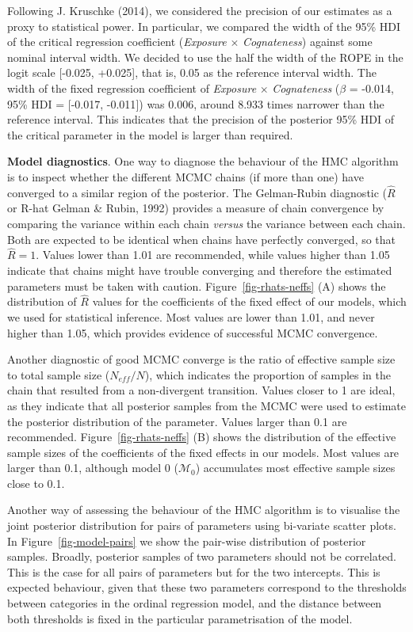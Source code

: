 \documentclass[
  12pt,
  b5paperpaper,
  twoside]{scrreprt}
\begin{document}
Following J. Kruschke (2014), we considered the precision of our
estimates as a proxy to statistical power. In particular, we compared
the width of the 95\% HDI of the critical regression coefficient
(\emph{Exposure} \(\times\) \emph{Cognateness}) against some nominal
interval width. We decided to use the half the width of the ROPE in the
logit scale {[}-0.025, +0.025{]}, that is, 0.05 as the reference
interval width. The width of the fixed regression coefficient of
\emph{Exposure} \(\times\) \emph{Cognateness} (\(\beta\) = -0.014, 95\%
HDI = {[}-0.017, -0.011{]}) was 0.006, around 8.933 times narrower than
the reference interval. This indicates that the precision of the
posterior 95\% HDI of the critical parameter in the model is larger than
required.

\textbf{Model diagnostics}. One way to diagnose the behaviour of the HMC
algorithm is to inspect whether the different MCMC chains (if more than
one) have converged to a similar region of the posterior. The
Gelman-Rubin diagnostic (\(\hat{R}\) or R-hat Gelman \& Rubin, 1992)
provides a measure of chain convergence by comparing the variance within
each chain \emph{versus} the variance between each chain. Both are
expected to be identical when chains have perfectly converged, so that
\(\hat{R} = 1\). Values lower than 1.01 are recommended, while values
higher than 1.05 indicate that chains might have trouble converging and
therefore the estimated parameters must be taken with caution.
Figure~\ref{fig-rhats-neffs} (A) shows the distribution of \(\hat{R}\)
values for the coefficients of the fixed effect of our models, which we
used for statistical inference. Most values are lower than 1.01, and
never higher than 1.05, which provides evidence of successful MCMC
convergence.

Another diagnostic of good MCMC converge is the ratio of effective
sample size to total sample size (\(N_{eff}/N\)), which indicates the
proportion of samples in the chain that resulted from a non-divergent
transition. Values closer to 1 are ideal, as they indicate that all
posterior samples from the MCMC were used to estimate the posterior
distribution of the parameter. Values larger than 0.1 are recommended.
Figure~\ref{fig-rhats-neffs} (B) shows the distribution of the effective
sample sizes of the coefficients of the fixed effects in our models.
Most values are larger than 0.1, although model 0 (\(\mathcal{M}_0\))
accumulates most effective sample sizes close to 0.1.

Another way of assessing the behaviour of the HMC algorithm is to
visualise the joint posterior distribution for pairs of parameters using
bi-variate scatter plots. In Figure~\ref{fig-model-pairs} we show the
pair-wise distribution of posterior samples. Broadly, posterior samples
of two parameters should not be correlated. This is the case for all
pairs of parameters but for the two intercepts. This is expected
behaviour, given that these two parameters correspond to the thresholds
between categories in the ordinal regression model, and the distance
between both thresholds is fixed in the particular parametrisation of
the model.
\end{document}
